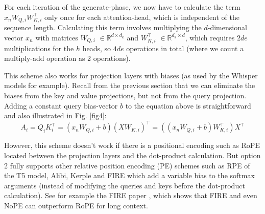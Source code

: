 \documentclass{article}
\newcommand{\eR}[2]{$\in \mathbb{R}^{#1 \times #2}$} %
\begin{document}
For each iteration of the generate-phase, we now have to calculate the term $x_n W_{Q,i} W_{K,i}^\top$ only once for each attention-head, which is independent of the sequence length. Calculating this term involves multiplying the $d$-dimensional vector $x_n$ with matrices $W_{Q,i}$ \eR{d}{d_k} and $W_{K,i}^\top$ \eR{d_k}{d}, which requires $2 d e$ multiplications for the $h$ heads, so $4 d e$ operations in total (where we count a multiply-add operation as 2 operations).

This scheme also works for projection layers with biases (as used by the Whisper models for example). Recall from the previous section that we can eliminate the biases from the key and value projections, but not from the query projection. Adding a constant query bias-vector $b$ to the equation above is straightforward and also illustrated in Fig. \ref{fig4}:
\begin{equation*}
  A_i = Q_i K_i^\top = (x_n W_{Q,i} + b) (X W_{K,i})^\top = ((x_n W_{Q,i} + b) W_{K,i}^\top) X^\top
\end{equation*}

However, this scheme doesn’t work if there is a positional encoding such as RoPE located between the projection layers and the dot-product calculation. But option 2 fully supports other relative position encoding (PE) schemes such as RPE of the T5 model, Alibi, Kerple and FIRE \citep{FIRE} which add a variable bias to the softmax arguments (instead of modifying the queries and keys before the dot-product calculation). See for example the FIRE paper \citep{FIRE}, which shows that FIRE and even NoPE can outperform RoPE for long context.
\end{document}
